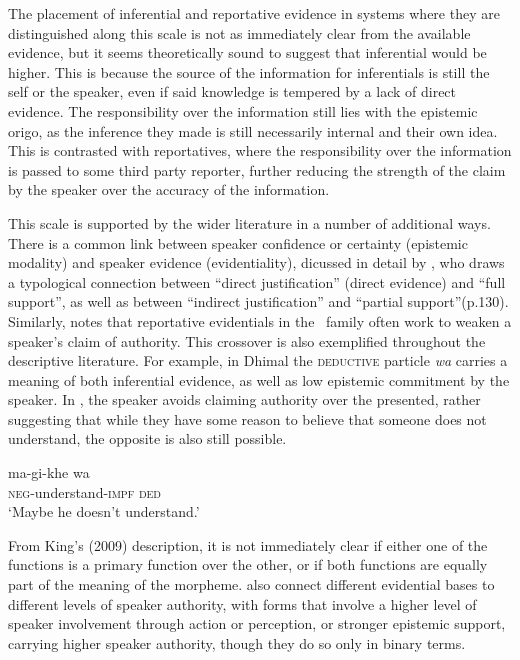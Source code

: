 The placement of inferential and reportative evidence in systems where they are distinguished along this scale is not as immediately clear from the available evidence, but it seems theoretically sound to suggest that inferential would be higher. This is because the source of the information for inferentials is still the self or the speaker, even if said knowledge is tempered by a lack of direct evidence. The responsibility over the information still lies with the epistemic origo, as the inference they made is still necessarily internal and their own idea. This is contrasted with reportatives, where the responsibility over the information is passed to some third party reporter, further reducing the strength of the claim by the speaker over the accuracy of the information.

This scale is supported by the wider literature in a number of additional ways. There is a common link between speaker confidence or certainty (epistemic modality) and speaker evidence (evidentiality), dicussed in detail by , who draws a typological connection between ``direct justification'' (direct evidence) and ``full support'', as well as between ``indirect justification'' and ``partial support''(p.130). Similarly,  notes that reportative evidentials in the \lfam\ family often work to weaken a speaker's claim of authority. This crossover is also exemplified throughout the descriptive literature. For example, in Dhimal \cite[Dhimalish: India,][245]{King2009} the \textsc{deductive} particle \textit{wa} carries a meaning of both inferential evidence, as well as low epistemic commitment by the speaker. In , the speaker avoids claiming authority over the presented, rather suggesting that while they have some reason to believe that someone does not understand, the opposite is also still possible.

\begin{exe}
        \ex\label{e:Description:DhimalDeductive}
        \gll ma-gi-khe wa \\
        \textsc{neg}-understand-\textsc{impf} \textsc{ded} \\
        \glt `Maybe he doesn't understand.' \cite[Dhimal,][245]{King2009}
\end{exe}

From King's (2009) description, it is not immediately clear if either one of the functions is a primary function over the other, or if both functions are equally part of the meaning of the morpheme.  also connect different evidential bases to different levels of speaker authority, with forms that involve a higher level of speaker involvement through action or perception, or stronger epistemic support, carrying higher speaker authority, though they do so only in binary terms.

